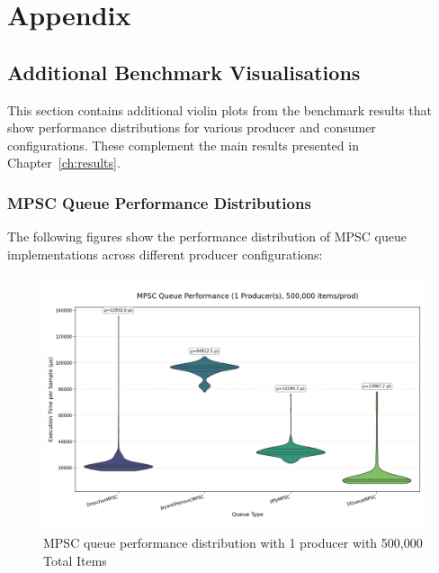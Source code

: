 \chapter{Appendix}

\section{Additional Benchmark Visualisations}
This section contains additional violin plots from the benchmark results that show performance distributions for various producer and consumer configurations. These complement the main results presented in Chapter~\ref{ch:results}.

\subsection{MPSC Queue Performance Distributions}\label{subsec:mpsc-violin}
The following figures show the performance distribution of MPSC queue implementations across different producer configurations:

\begin{figure}[H]
\centering
\caption{MPSC queue performance distribution with 1 producer with 500,000 Total Items}
\label{fig:mpsc-violin-1p}
\includegraphics[width=\textwidth]{images/results/mpsc_performance_violin_1_producers.png}
\end{figure}

